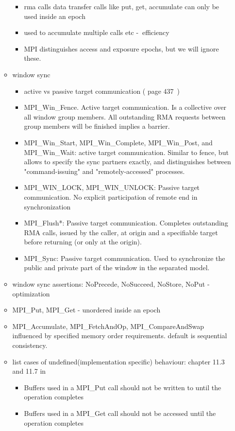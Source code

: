 \documentclass[a4paper, 10pt]{article}
\begin{document}
\begin{itemize}
\begin{itemize}
\begin{itemize}
					\item rma calls data transfer calls like put, get, accumulate can only be used inside an epoch
					\item used to accumulate multiple calls etc -$\>$ efficiency
					\item MPI distinguishes access and exposure epochs, but we will ignore these.
				\end{itemize}
			\item window sync
				\begin{itemize}
					\item active vs passive target communication (\cite{mpi3} page 437~)
					\item MPI\_Win\_Fence. Active target communication. Is a collective over all window group members. All outstanding RMA requests between group members will be finished implies a barrier.
					\item MPI\_Win\_Start, MPI\_Win\_Complete, MPI\_Win\_Post, and MPI\_Win\_Wait: active target communication. Similar to fence, but allows to specify the sync partners exactly, and distinguishes between "command-issuing" and "remotely-accessed" processes.
					\item MPI\_WIN\_LOCK, MPI\_WIN\_UNLOCK: Passive target communication. No explicit participation of remote end in synchronization
					\item MPI\_Flush*: Passive target communication. Completes outstanding RMA calls, issued by the caller, at origin and a specifiable target before returning (or only at the origin).
					\item MPI\_Sync: Passive target communication. Used to synchronize the public and private part of the window in the separated model.
				\end{itemize}
			\item window sync assertions: NoPrecede, NoSucceed, NoStore, NoPut -$\>$ optimization
			\item MPI\_Put, MPI\_Get - unordered inside an epoch
			\item MPI\_Accumulate, MPI\_FetchAndOp, MPI\_CompareAndSwap influenced by specified memory order requirements. default is sequential consistency.
			\item list cases of undefined(implementation specific) behaviour: chapter 11.3 and 11.7 in \cite{mpi3}
				\begin{itemize}
					\item Buffers used in a MPI\_Put call should not be written to until the operation completes
					\item Buffers used in a MPI\_Get call should not be accessed until the operation completes

\end{itemize}
\end{itemize}
\end{itemize}
\end{document}
